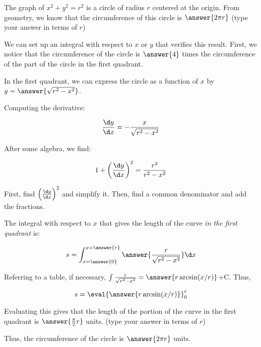 \documentclass{ximera}
\author{Jim Talamo}
\begin{document}
\begin{exercise}

The graph of $x^2+y^2=r^2$ is a circle of radius $r$ centered at the origin.  From geometry, we know that the circumference of this circle is $\answer{2 \pi r}$ (type your answer in terms of $r$)

\begin{exercise}
We can set up an integral with respect to $x$ or $y$ that verifies this result.  First, we notice that the circumference of the circle is $\answer{4}$ times the circumference of the part of the circle in the first quadrant.

In the first quadrant, we can express the circle as a function of $x$ by $y=\answer{\sqrt{r^2-x^2}}$.

\begin{exercise}
Computing the derivative:

\[
\frac{\d y}{\d x} = -\frac{x}{\sqrt{r^2-x^2}}
\]

\begin{exercise}

After some algebra, we find:

\[
1+ \left(\frac{\d y}{\d x} \right)^2 = \frac{r^2}{r^2-x^2}
\]

\begin{hint}
First, find $\left(\frac{\d y}{\d x} \right)^2$ and simplify it.  Then, find a common denominator and add the fractions.
\end{hint}

\begin{exercise}

The integral with respect to $x$ that gives the length of the curve \emph{in the first quadrant} is:

\[
s= \int_{x=\answer{0}}^{x=\answer{r}} \answer{\frac{r}{\sqrt{r^2-x^2}}} \d x
\]

\begin{exercise}
Referring to a table, if necessary, $\int \frac{r}{\sqrt{r^2-x^2}} = \answer{r \arcsin(x/r)}$+C.  Thus,

\[
s= \eval{\answer{r \arcsin(x/r)}}_0^r
\]

Evaluating this gives that the length of the portion of the curve in the first quadrant is $\answer{\frac{\pi}{2}r}$ units. (type your answer in terms of $r$)

\begin{exercise}
Thus, the circumference of the circle is $\answer{2 \pi r}$ units.
\end{exercise}

\end{exercise}
\end{exercise}
\end{exercise}
\end{exercise}
\end{exercise}
\end{exercise}
\end{document}
